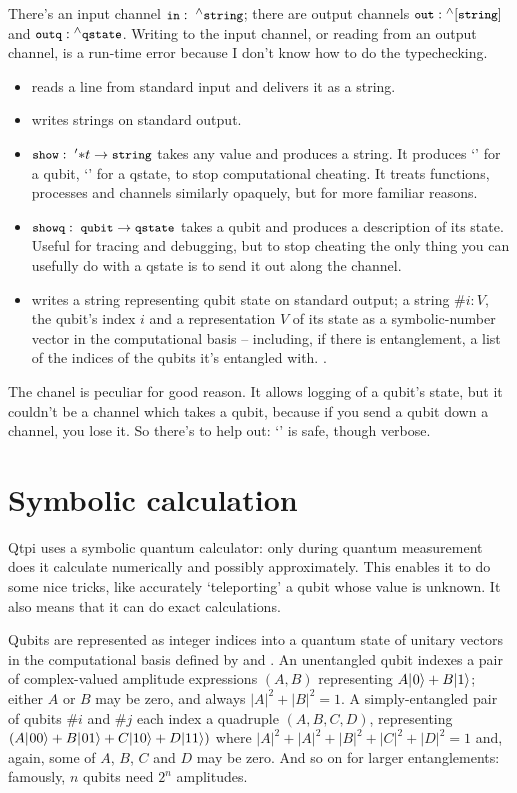 There's an input channel $\texttt{\small{}in}:\; {}^{\wedge}{}\texttt{\small{}string}$; there are output channels $\texttt{\small{}out}: {}^{\wedge}{}[\texttt{\small{}string}]$ and $\texttt{\small{}outq}: {}^{\wedge}{}\texttt{\small{}qstate}$. Writing to the input channel, or reading from an output channel, is a run-time error because I don't know how to do the typechecking.
\begin{itemize}
\item {} reads a line from standard input and delivers it as a string. 
\item {} writes strings on standard output. 
\item $\texttt{\small{}show}:\; '{*}t->\texttt{\small{}string}$ takes any value and produces a string. It produces `' for a qubit, `' for a qstate, to stop computational cheating. It treats functions, processes and channels similarly opaquely, but for more familiar reasons.
\item $\texttt{\small{}showq}:\; \texttt{\small{}qubit} ->\texttt{\small{}qstate}$ takes a qubit and produces a description of its state. Useful for tracing and debugging, but to stop cheating the only thing you can usefully do with a qstate is to send it out along the  channel.
\item {} writes a string representing qubit state  on standard output; a string $\#i:V$, the qubit's index $i$ and a representation $V$ of its state as a symbolic-number vector in the computational basis -- including, if there is entanglement, a list of the indices of the qubits it's entangled with.
.
\end{itemize}

The  chanel is peculiar for good reason. It allows logging of a qubit's state, but it couldn't be a channel which takes a qubit, because if you send a qubit down a channel, you lose it. So there's  to help out: `' is safe, though verbose. 

\section{Symbolic calculation}

Qtpi uses a symbolic quantum calculator: only during quantum measurement does it calculate numerically and possibly approximately. This enables it to do some nice tricks, like accurately `teleporting' a qubit whose value is unknown. It also means that it can do exact calculations.

Qubits are represented as integer indices into a quantum state of unitary vectors in the computational basis defined by \zero{} and \one. An unentangled qubit indexes a pair of complex-valued amplitude expressions $(A, B)$ representing $A|\hspace{0.5pt}0\rangle+B|1\rangle\relax$; either $A$ or $B$ may be zero, and always $|A|^{2}+|B|^{2}=1$. A simply-entangled pair of qubits $\#i$ and $\#j$ each index a quadruple $(A,B,C,D)$, representing $(A|\hspace{0.5pt}00\rangle+B|\hspace{0.5pt}01\rangle+C|10\rangle+D|11\rangle)$ where $|A|^{2}+|A|^{2}+|B|^{2}+|C|^{2}+|D|^{2}=1$ and, again, some of $A$, $B$, $C$ and $D$ may be zero. And so on for larger entanglements: famously, $n$ qubits need $2^{n}$ amplitudes.


